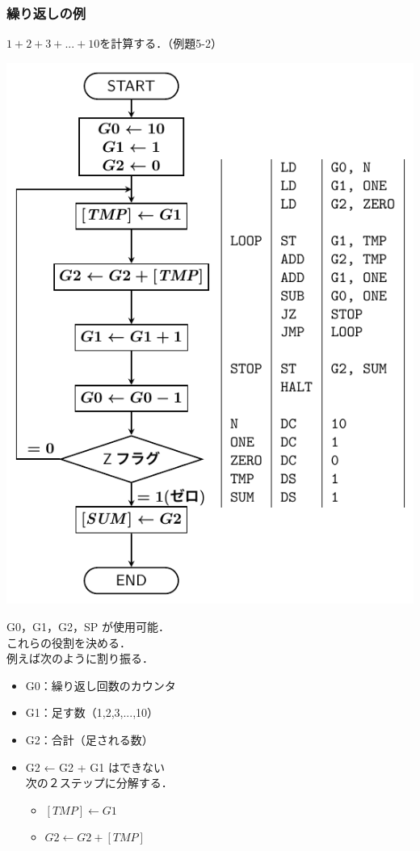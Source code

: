 \documentclass{beamer}                 %
\begin{document}
\begin{frame}
  \frametitle{繰り返しの例}
  $1 + 2 + 3 + ... + 10$を計算する．（例題5-2）\\
  \vfill
  \begin{minipage}{0.47\columnwidth}
    \centerline{\includegraphics[scale=0.55]{../Tikz/flow3.pdf}}
  \end{minipage}
  \begin{minipage}{0.52\columnwidth}
    {\ttfamily
      G0，G1，G2，SP が使用可能．\\
      これらの役割を決める．\\
      例えば次のように割り振る．
      \begin{itemize}
      \item G0：繰り返し回数のカウンタ
      \item G1：足す数（1,2,3,...,10）
      \item G2：合計（足される数）
      \item G2 ← G2 + G1 はできない \\
        次の２ステップに分解する．
        \begin{itemize}
          \item $[TMP] ← G1$
          \item $G2 ←G2 + [TMP]$
        \end{itemize}
      \end{itemize}
    }
  \end{minipage}
  \vfill
\end{frame}
\end{document}

